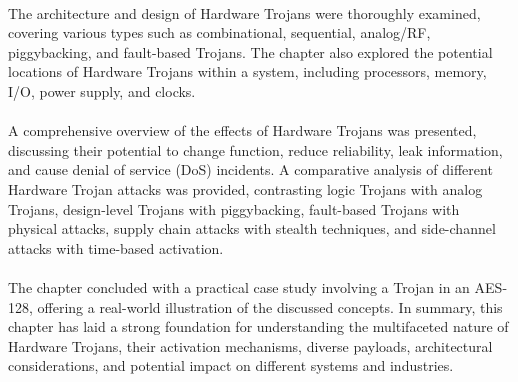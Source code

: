 \paragraph*{}
The architecture and design of Hardware Trojans were thoroughly examined, covering various types such as combinational, sequential, analog/RF, piggybacking, and fault-based Trojans. The chapter also explored the potential locations of Hardware Trojans within a system, including processors, memory, I/O, power supply, and clocks.
\paragraph*{}
A comprehensive overview of the effects of Hardware Trojans was presented, discussing their potential to change function, reduce reliability, leak information, and cause denial of service (DoS) incidents. A comparative analysis of different Hardware Trojan attacks was provided, contrasting logic Trojans with analog Trojans, design-level Trojans with piggybacking, fault-based Trojans with physical attacks, supply chain attacks with stealth techniques, and side-channel attacks with time-based activation.
\paragraph*{}
The chapter concluded with a practical case study involving a Trojan in an AES-128, offering a real-world illustration of the discussed concepts. In summary, this chapter has laid a strong foundation for understanding the multifaceted nature of Hardware Trojans, their activation mechanisms, diverse payloads, architectural considerations, and potential impact on different systems and industries. 



